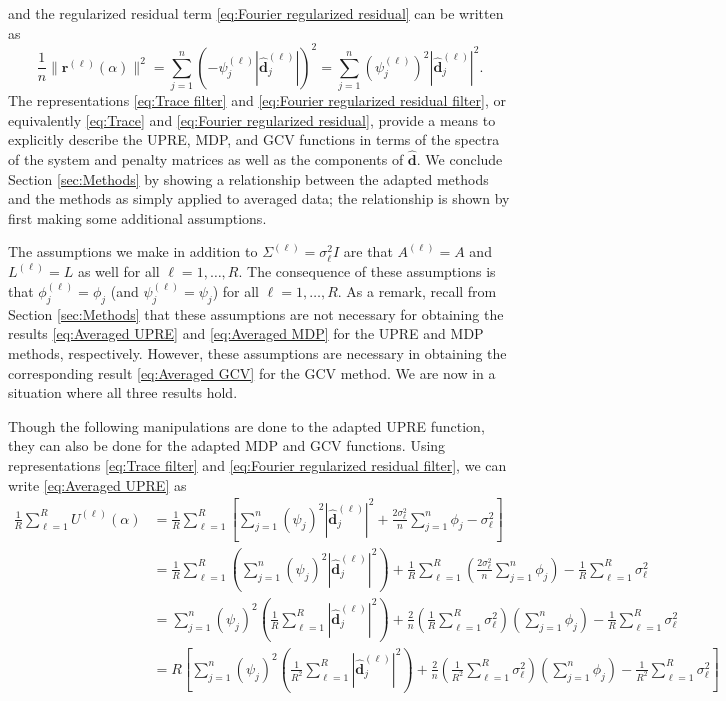 \documentclass[12pt]{article}
\newcommand{\dVec}{\mathbf{d}}	%
\newcommand{\rVec}{\mathbf{r}}	%
\newcommand{\dft}[1]{\widehat{#1}}	%
\newcommand{\regparam}{\alpha}
\newcommand{\filt}{\phi}
\newcommand{\mfilt}{\psi}
\newcommand{\noiseSD}{\sigma}	%
\newcommand{\U}{U}	%
\begin{document}
and the regularized residual term \eqref{eq:Fourier regularized residual} can be written as
\begin{equation}
\label{eq:Fourier regularized residual filter}
\frac{1}{n}\|\rVec^{(\ell)}(\regparam)\|^2 = \sum_{j=1}^{n} \left(-\mfilt_j^{(\ell)}|\dft{\dVec}_j^{(\ell)}|\right)^2 = \sum_{j=1}^{n} \left(\mfilt_j^{(\ell)}\right)^2|\dft{\dVec}_j^{(\ell)}|^2.
\end{equation}
The representations \eqref{eq:Trace filter} and \eqref{eq:Fourier regularized residual filter}, or equivalently \eqref{eq:Trace} and \eqref{eq:Fourier regularized residual}, provide a means to explicitly describe the UPRE, MDP, and GCV functions in terms of the spectra of the system and penalty matrices as well as the components of $\dft{\dVec}$. We conclude Section \ref{sec:Methods} by showing a relationship between the adapted methods and the methods as simply applied to averaged data; the relationship is shown by first making some additional assumptions. \par 
The assumptions we make in addition to $\Sigma^{(\ell)} = \noiseSD_\ell^2 I$ are that $A^{(\ell)} = A$ and $L^{(\ell)} = L$ as well for all $\ell = 1,\ldots,R$. The consequence of these assumptions is that $\filt_j^{(\ell)} = \filt_j$ (and $\mfilt_j^{(\ell)} = \mfilt_j$) for all $\ell = 1,\ldots,R$. As a remark, recall from Section \ref{sec:Methods} that these assumptions are not necessary for obtaining the results \eqref{eq:Averaged UPRE} and \eqref{eq:Averaged MDP} for the UPRE and MDP methods, respectively. However, these assumptions are necessary in obtaining the corresponding result \eqref{eq:Averaged GCV} for the GCV method. We are now in a situation where all three results hold. \par 
Though the following manipulations are done to the adapted UPRE function, they can also be done for the adapted MDP and GCV functions. Using representations \eqref{eq:Trace filter} and \eqref{eq:Fourier regularized residual filter}, we can write \eqref{eq:Averaged UPRE} as
\begin{align}
\label{eq:Non-average UPRE}
\frac{1}{R} \sum_{\ell=1}^R \U^{(\ell)}(\regparam) &= \frac{1}{R} \sum_{\ell=1}^R \left[\sum_{j=1}^{n} \left(\mfilt_j\right)^2|\dft{\dVec}_j^{(\ell)}|^2 + \frac{2\noiseSD_\ell^2}{n} \sum_{j=1}^{n} \filt_j - \noiseSD_\ell^2\right] \nonumber \\
&= \frac{1}{R} \sum_{\ell=1}^R \left(\sum_{j=1}^{n} \left(\mfilt_j\right)^2|\dft{\dVec}_j^{(\ell)}|^2\right) + \frac{1}{R} \sum_{\ell=1}^R \left(\frac{2\noiseSD_\ell^2}{n} \sum_{j=1}^{n} \filt_j\right) - \frac{1}{R} \sum_{\ell=1}^R\noiseSD_\ell^2 \nonumber \\
&= \sum_{j=1}^{n} \left(\mfilt_j\right)^2\left(\frac{1}{R} \sum_{\ell=1}^R |\dft{\dVec}_j^{(\ell)}|^2\right) + \frac{2}{n} \left(\frac{1}{R} \sum_{\ell=1}^R \noiseSD_\ell^2\right) \left(\sum_{j=1}^{n} \filt_j\right) - \frac{1}{R} \sum_{\ell=1}^R\noiseSD_\ell^2 \nonumber \\
&= R\left[\sum_{j=1}^{n} \left(\mfilt_j\right)^2\left(\frac{1}{R^2} \sum_{\ell=1}^R |\dft{\dVec}_j^{(\ell)}|^2\right) + \frac{2}{n} \left(\frac{1}{R^2} \sum_{\ell=1}^R \noiseSD_\ell^2\right) \left(\sum_{j=1}^{n} \filt_j\right) - \frac{1}{R^2} \sum_{\ell=1}^R\noiseSD_\ell^2\right]
\end{align}
\end{document}
